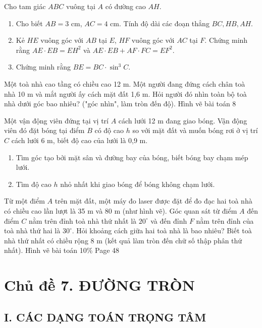 \documentclass[%
    fontsize=12pt,%
    chapterprefix=false,%
    open=right,%
    twoside=false,%
    numbers=noenddot,%
    headings=optiontohead,%
    final,%
    DIV=15,%
    parskip=half %
]{scrbook}
\begin{document}
\begin{tuluan}
\item Cho tam giác $ABC$ vuông tại $A$ có đường cao $AH$.
\begin{enumerate}[label=\alph*)]
  \item[a)] Cho biết $AB = 3$ cm, $AC = 4$ cm. Tính độ dài các đoạn thẳng $BC, HB, AH$.
  \item[b)] Kẻ $ HE $ vuông góc với $ AB $ tại $ E $, $ HF $ vuông góc với $ AC $ tại $ F $. Chứng minh rằng $ AE \cdot EB = EH^2 $ và $ AE \cdot EB + AF \cdot FC = EF^2 $.
  \item[c)] Chứng minh rằng $ BE = BC \cdot \sin^3 C $.
\end{enumerate}

\item Một toà nhà cao tầng có chiều cao 12 m. Một người đang đứng cách chân toà nhà 10 m và mắt người ấy cách mặt đất 1,6 m. Hỏi người đó nhìn toàn bộ toà nhà dưới góc bao nhiêu? ("góc nhìn", làm tròn đến độ). Hình vẽ bài toán 8

\item Một vận động viên đứng tại vị trí $ A $ cách lưới 12 m đang giao bóng. Vận động viên đó đặt bóng tại điểm $ B $ có độ cao $ h $ so với mặt đất và muốn bóng rơi ở vị trí $ C $ cách lưới 6 m, biết độ cao của lưới là 0,9 m.
\begin{enumerate}[label=\alph*)]
  \item[a)] Tìm góc tạo bởi mặt sân và đường bay của bóng, biết bóng bay chạm mép lưới.
  \item[b)] Tìm độ cao $ h $ nhỏ nhất khi giao bóng để bóng không chạm lưới.
\end{enumerate}

\item Từ một điểm $ A $ trên mặt đất, một máy đo laser được đặt để đo đạc hai toà nhà có chiều cao lần lượt là 35 m và 80 m (như hình vẽ). Góc quan sát từ điểm $ A $ đến điểm $ C $ nằm trên đỉnh toà nhà thứ nhất là $ 20^\circ $ và đến đỉnh $ F $ nằm trên đỉnh của toà nhà thứ hai là $ 30^\circ $. Hỏi khoảng cách giữa hai toà nhà là bao nhiêu? Biết toà nhà thứ nhất có chiều rộng 8 m (kết quả làm tròn đến chữ số thập phân thứ nhất). Hình vẽ bài toán 10\% Page 48

\end{tuluan}

\section{Chủ đề 7. ĐƯỜNG TRÒN}
\subsection{I. CÁC DẠNG TOÁN TRỌNG TÂM}
\end{document}
